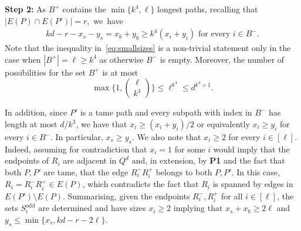 \documentclass[reqno,final,a4paper]{amsart}
\theoremstyle{definition}
\newcommand{\1}{\mathbbm{1}}
\begin{document}
\vspace{0.5em}
\noindent 
\textbf{Step 2:}  As $B^+$ contains the $\min\{k^4,\ell\}$ longest paths, recalling that $|E(P)\cap E(P')|=r$,~we~have 
\begin{align}\label{eq:smallsizes}
kd-r-x_s-y_s= x_b+y_b\geq k^4(x_i+y_i)\text{ for every }i\in B^-.
\end{align}
Note that the inequality in~\eqref{eq:smallsizes} is a non-trivial statement only in the case when $|B^+|=\ell\ge k^4$ as otherwise $B^-$ is empty. Moreover, the number of possibilities for the set $B^+$ is at most
\begin{equation}\label{eq:step2}
\max\bigg\{1,\binom{\ell}{k^4}\bigg\}\leq \ell^{k^4}\leq d^{k^4+1}.    
\end{equation}


In addition, since $P'$ is a tame path and every subpath with index in $B^-$ has length at most $d/k^3$, we have that $x_i\ge (x_i+y_i)/2$ or equivalently $x_i\ge y_i$ for every $i\in B^-$. In particular, $x_s\ge y_s$. 
We also note that $x_i\geq 2$ for every $i\in [\ell]$. 
Indeed, assuming for contradiction that $x_i=1$ for some $i$ would imply that the endpoints of $R_i$ are adjacent in $Q^d$ and, in extension, by \textbf{P1} and the fact that both $P,P'$ are tame, that the edge $R^-_iR^+_i$ belongs to both $P,P'$. In this case, $R_i=R^-_iR^+_i\in E(P)$, which contradicts the fact that $R_i$ is spanned by edges in $E(P')\setminus E(P)$. 
Summarising, given the endpoints $R_i^-,R_i^+$ for all $i\in [\ell]$, the sets $S_i^{\mathrm{odd}}$ are determined and have sizes $x_i\geq 2$ implying that $x_s+x_b\ge 2\ell$ and $y_s\leq \min\{x_s, kd-r-2\ell\}$.
\end{document}
